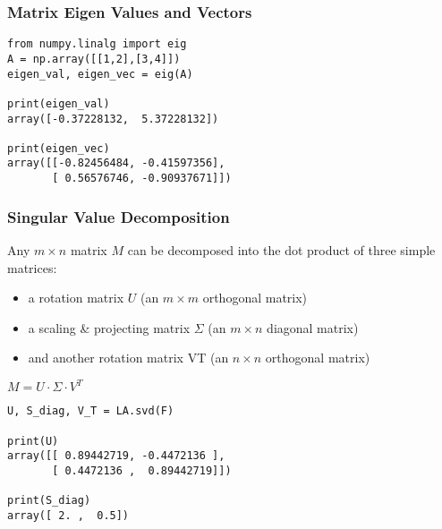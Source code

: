  \begin{frame}[fragile] \frametitle{Matrix Eigen Values and Vectors}

\begin{lstlisting}
from numpy.linalg import eig
A = np.array([[1,2],[3,4]])
eigen_val, eigen_vec = eig(A)

print(eigen_val)
array([-0.37228132,  5.37228132])

print(eigen_vec)
array([[-0.82456484, -0.41597356],
       [ 0.56576746, -0.90937671]])
\end{lstlisting}

\end{frame}


 \begin{frame}[fragile] \frametitle{Singular Value Decomposition}

Any $m \times n$  matrix $M$ can be decomposed into the dot product of three simple matrices:
\begin{itemize}
\item a rotation matrix $U$  (an $m \times m$ orthogonal matrix)
\item a scaling \& projecting matrix $\Sigma$ (an $m \times n$ diagonal matrix)
\item and another rotation matrix  VT  (an $n \times n$ orthogonal matrix)
\end{itemize}

$M = U \cdot \Sigma \cdot V^{T}$

\begin{lstlisting}
U, S_diag, V_T = LA.svd(F)

print(U)
array([[ 0.89442719, -0.4472136 ],
       [ 0.4472136 ,  0.89442719]])
			 
print(S_diag)
array([ 2. ,  0.5])
\end{lstlisting}

\end{frame}
